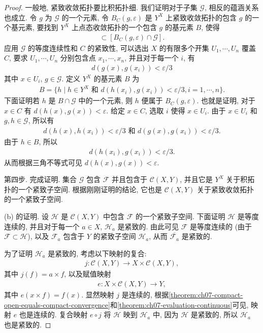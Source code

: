 \documentclass[../../main.tex]{subfiles}
\begin{document}
\begin{proof}
一般地, 紧致收敛拓扑要比积拓扑细. 我们证明对于子集 $\mathcal{G}$, 相反的蕴涵关系也成立. 令 $g$ 为 $\mathcal{G}$ 的一个元素, 令 $B_C(g,\varepsilon)$ 是 $Y^X$ 上紧致收敛拓扑的包含 $g$ 的一个基元素, 要找到 $Y^X$ 上点态收敛拓扑的一个包含 $g$ 的基元素 $B$, 使得
\begin{align*}
[B\cap\mathcal{G}]\subset[B_C(g,\varepsilon)\cap\mathcal{G}].
\end{align*}
应用 $\mathcal{G}$ 的等度连续性和 $C$ 的紧致性, 可以选出 $X$ 的有限多个开集 $U_1,\cdots,U_n$ 覆盖 $C$, 要求 $U_1,\cdots,U_n$ 分别包含点 $x_1,\cdots,x_n$, 并且对于每一个 $i$, 有
\begin{align*}
d(g(x),g(x_i))<\varepsilon/3
\end{align*}
其中 $x\in U_i$, $g\in\mathcal{G}$. 定义 $Y^X$ 的基元素 $B$ 为
\begin{align*}
B=\{h\mid h\in Y^X\text{ 和 }d(h(x_i),g(x_i))<\varepsilon/3,i=1,\cdots,n\}.
\end{align*}
下面证明若 $h$ 是 $B\cap\mathcal{G}$ 中的一个元素, 则 $h$ 便属于 $B_C(g,\varepsilon)$. 也就是证明, 对于 $x\in C$ 有 $d(h(x),g(x))<\varepsilon$. 给定 $x\in C$, 选取 $i$ 使得 $x\in U_i$. 由于 $x\in U_i$ 和 $g,h\in\mathcal{G}$, 所以有
\begin{align*}
d(h(x),h(x_i))<\varepsilon/3\text{ 和 }d(g(x),g(x_i))<\varepsilon/3.
\end{align*}
由于 $h\in B$, 所以
\begin{align*}
d(h(x_i),g(x_i))<\varepsilon/3.
\end{align*}
从而根据三角不等式可见 $d(h(x),g(x))<\varepsilon$.

第四步. 完成证明. 集合 $\mathcal{G}$ 包含 $\mathcal{F}$ 并且包含于 $\mathcal{C}(X,Y)$, 并且它是 $Y^X$ 关于积拓扑的一个紧致子空间. 根据刚刚证明的结论, 它也是 $\mathcal{C}(X,Y)$ 关于紧致收敛拓扑的一个紧致子空间.

(b) 的证明. 设 $\mathcal{H}$ 是 $\mathcal{C}(X,Y)$ 中包含 $\mathcal{F}$ 的一个紧致子空间. 下面证明 $\mathcal{H}$ 是等度连续的, 并且对于每一个 $a\in X$, $\mathcal{H}_a$ 是紧致的. 由此可见 $\mathcal{F}$ 是等度连续的 (由于 $\mathcal{F}\subset\mathcal{H}$), 以及 $\mathcal{F}_a$ 包含于 $Y$ 的紧致子空间 $\mathcal{H}_a$, 从而 $\overline{\mathcal{F}_a}$ 是紧致的.

为了证明 $\mathcal{H}_a$ 是紧致的, 考虑以下映射的复合:
\begin{align*}
j\colon\mathcal{C}(X,Y)\longrightarrow X\times\mathcal{C}(X,Y),
\end{align*}
其中 $j(f)=a\times f$, 以及赋值映射
\begin{align*}
e\colon X\times\mathcal{C}(X,Y)\longrightarrow Y,
\end{align*}
其中 $e(x\times f)=f(x)$. 显然映射 $j$ 是连续的, 根据\cref{theorem:ch07-compact-open-equals-compact-convergence}和\cref{theorem:ch07-evaluation-continuous}可见, 映射 $e$ 也是连续的. 复合映射 $e\circ j$ 将 $\mathcal{H}$ 映到 $\mathcal{H}_a$ 中, 因为 $\mathcal{H}$ 是紧致的, 所以 $\mathcal{H}_a$ 也是紧致的.


\end{proof}
\end{document}
